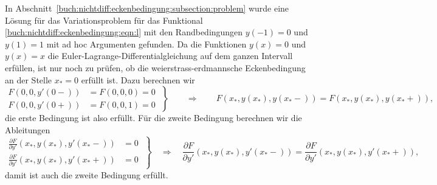 \begin{beispiel}
In Abschnitt~\ref{buch:nichtdiff:eckenbedingung:subsection:problem}
wurde eine Lösung für das Variationsproblem für das Funktional
\eqref{buch:nichtdiff:eckenbedingung:eqn:l} mit den Randbedingungen
$y(-1)=0$ und $y(1)=1$ mit ad hoc Argumenten gefunden.
Da die Funktionen $y(x)=0$ und $y(x)=x$ die
Euler-Lagrange-Differentialgleichung auf dem ganzen Intervall
erfüllen, ist nur noch zu prüfen, ob die weierstrass-erdmannsche
Eckenbedingung an der Stelle $x_*=0$ erfüllt ist.
Dazu berechnen wir 
\begin{equation}
\left.
\begin{aligned}
F(0,0,y'(0-))&=F(0,0,0)=0
\\
F(0,0,y'(0+))&=F(0,0,1)=0
\end{aligned}
\;
\right\}
\qquad\Rightarrow\qquad
F(x_*,y(x_*),y(x_*-))=F(x_*,y(x_*),y(x_*+)),
\end{equation}
die erste Bedingung ist also erfüllt.
Für die zweite Bedingung berechnen wir die Ableitungen
\[
\left.
\begin{aligned}
\frac{\partial F}{\partial y'}(x_*,y(x_*),y'(x_*-))
&=
0
\\
\frac{\partial F}{\partial y'}(x_*,y(x_*),y'(x_*+))
&=
0
\end{aligned}
\;\right\}
\quad\Rightarrow\quad
\frac{\partial F}{\partial y'}(x_*,y(x_*),y'(x_*-))
=
\frac{\partial F}{\partial y'}(x_*,y(x_*),y'(x_*+)),
\]
damit ist auch die zweite Bedingung erfüllt.
\end{beispiel}


